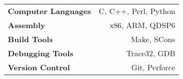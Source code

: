 \begin{tabular}{ l r }
\textbf{Computer Languages} & C, C++, Perl, Python \\
\textbf{Assembly} & x86, ARM, QDSP6 \\
\textbf{Build Tools} & Make, SCons \\
\textbf{Debugging Tools} & Trace32, GDB \\
\textbf{Version Control} & Git, Perforce \\
\end{tabular}

